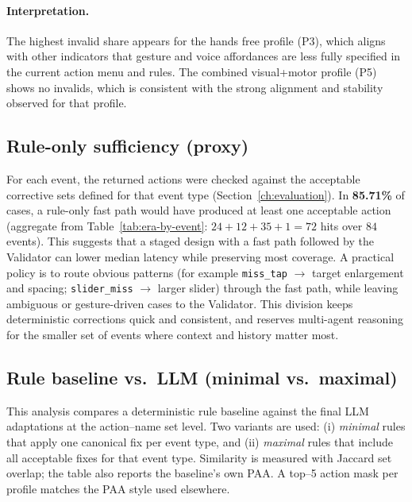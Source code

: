 \documentclass[openany]{book}
\begin{document}
\paragraph{Interpretation.}
The highest invalid share appears for the hands free profile (P3), which aligns with other indicators that gesture and voice affordances are less fully specified in the current action menu and rules. The combined visual+motor profile (P5) shows no invalids, which is consistent with the strong alignment and stability observed for that profile.


\subsection{Rule-only sufficiency (proxy)}
For each event, the returned actions were checked against the acceptable corrective sets defined for that event type (Section~\ref{ch:evaluation}). In \textbf{85.71\%} of cases, a rule-only fast path would have produced at least one acceptable action (aggregate from Table~\ref{tab:era-by-event}: $24{+}12{+}35{+}1=72$ hits over $84$ events). This suggests that a staged design with a fast path followed by the Validator can lower median latency while preserving most coverage. A practical policy is to route obvious patterns (for example \texttt{miss\_tap} $\rightarrow$ target enlargement and spacing; \texttt{slider\_miss} $\rightarrow$ larger slider) through the fast path, while leaving ambiguous or gesture-driven cases to the Validator. This division keeps deterministic corrections quick and consistent, and reserves multi-agent reasoning for the smaller set of events where context and history matter most.

\subsection{Rule baseline vs.\ LLM (minimal vs.\ maximal)}
This analysis compares a deterministic rule baseline against the final LLM adaptations at the action–name set level. Two variants are used: (i) \emph{minimal} rules that apply one canonical fix per event type, and (ii) \emph{maximal} rules that include all acceptable fixes for that event type. Similarity is measured with Jaccard set overlap; the table also reports the baseline’s own PAA. A top–5 action mask per profile matches the PAA style used elsewhere.
\end{document}
